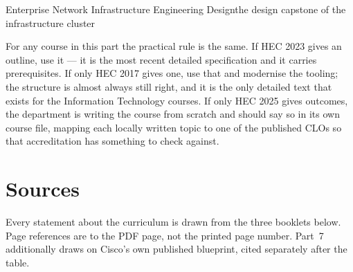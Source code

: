 \documentclass[11pt,a4paper,oneside]{report}
\begin{document}
\begin{coursecard}{Enterprise Network Infrastructure Engineering Design}{the design capstone of the infrastructure cluster}
\end{coursecard}


\begin{notebox}
For any course in this part the practical rule is the same. If HEC 2023 gives an
outline, use it --- it is the most recent detailed specification and it carries
prerequisites. If only HEC 2017 gives one, use that and modernise the tooling; the
structure is almost always still right, and it is the only detailed text that
exists for the Information Technology courses. If only HEC 2025 gives outcomes,
the department is writing the course from scratch and should say so in its own
course file, mapping each locally written topic to one of the published CLOs so
that accreditation has something to check against.
\end{notebox}

\section*{Sources}

Every statement about the curriculum is drawn from the three booklets below. Page
references are to the PDF page, not the printed page number. Part~7 additionally
draws on Cisco's own published blueprint, cited separately after the table.
\end{document}

